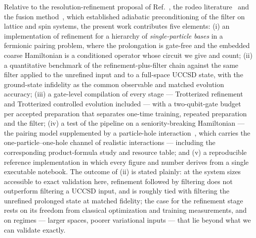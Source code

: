 \documentclass[
  aps,            %
  prc,            %
  reprint,        %
  superscriptaddress,
  floatfix,
  nofootinbib
]{revtex4-2}
\begin{document}
Relative to the resolution-refinement proposal of Ref.~\cite{Bogner2026}, the
rodeo literature~\cite{Choi2021,Qian2024} and the fusion
method~\cite{Patkowski2025fusion}, which established adiabatic preconditioning
of the filter on lattice and spin systems, the present work contributes five
elements: (i) an implementation of refinement for a hierarchy of
\emph{single-particle bases} in a fermionic pairing problem, where the
prolongation is gate-free and the embedded coarse Hamiltonian is a conditioned
operator whose circuit we give and count; (ii) a quantitative benchmark of the
refinement-plus-filter chain against the same filter applied to the unrefined
input and to a full-space UCCSD state, with the ground-state infidelity as the
common observable and matched evolution accuracy; (iii) a gate-level
compilation of every stage --- Trotterized refinement and Trotterized
controlled evolution included --- with a two-qubit-gate budget per accepted
preparation that separates one-time training, repeated preparation and the
filter; (iv) a test of the pipeline on a seniority-breaking Hamiltonian --- the
pairing model supplemented by a particle-hole interaction~\cite{MHJbook}, which
carries the one-particle--one-hole channel of realistic interactions ---
including the corresponding product-formula study and resource table; and (v)
a reproducible reference implementation in which every figure and number
derives from a single executable notebook.  The outcome of (ii) is stated
plainly: at the system sizes accessible to exact validation here, refinement
followed by filtering does not outperform filtering a UCCSD input, and is
roughly tied with filtering the unrefined prolonged state at matched fidelity;
the case for the refinement stage rests on its freedom from classical
optimization and training measurements, and on regimes --- larger spaces,
poorer variational inputs --- that lie beyond what we can validate exactly.

\end{document}
